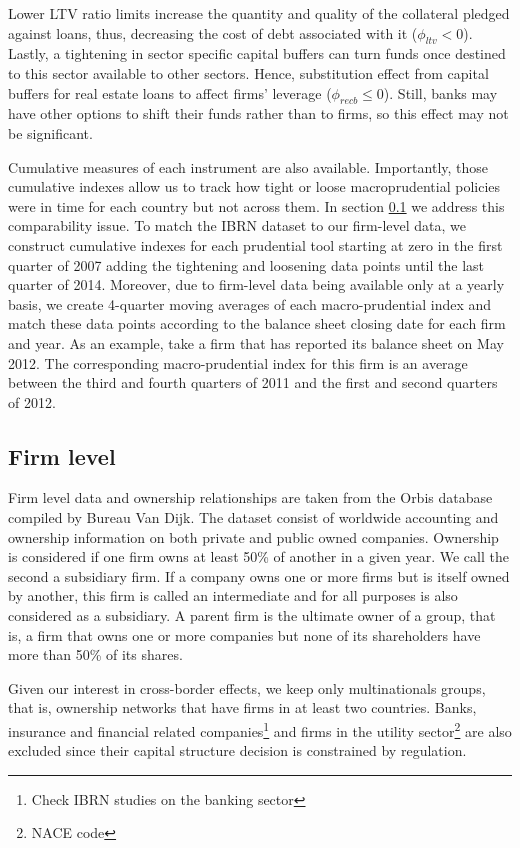 \documentclass[12pt]{article}
\begin{document}
Lower LTV ratio limits increase the quantity and quality of the collateral pledged against loans, thus, decreasing the cost of debt associated with it ($\phi_{ltv}<0$). Lastly, a tightening in sector specific capital buffers can turn funds once destined to this sector available to other sectors. Hence, substitution effect from capital buffers for real estate loans to affect firms' leverage ($\phi_{recb}\leq 0$). Still, banks may have other options to shift their funds rather than to firms, so this effect may not be significant.	 
	
    Cumulative measures of each instrument are also available. Importantly, those cumulative indexes allow us to track how tight or loose macroprudential policies were in time for each country but not across them. In section \ref{subsec:firm} we address this comparability issue. To match the IBRN dataset to our firm-level data, we construct cumulative indexes for each prudential tool starting at zero in the first quarter of 2007 adding the tightening and loosening data points until the last quarter of 2014. Moreover, due to firm-level data being available only at a yearly basis, we create 4-quarter moving averages of each macro-prudential index and match these data points according to the balance sheet closing date for each firm and year. As an example, take a firm that has reported its balance sheet on May 2012. The corresponding macro-prudential index for this firm is an average between the third and fourth quarters of 2011 and the first and second quarters of 2012. 
	  
 	\subsection{Firm level} \label{subsec:firm}
	Firm level data and ownership relationships are taken from the Orbis database compiled by Bureau Van Dijk.	The dataset consist of worldwide accounting and ownership information on both private and public owned companies. Ownership is considered if one firm owns at least 50\% of another in a given year. We call the second a subsidiary firm. If a company owns one or more firms but is itself owned by another, this firm is called an intermediate and for all purposes is also considered as a subsidiary. A parent firm is the ultimate owner of a group, that is, a firm that owns one or more companies but none of its shareholders have more than 50\% of its shares.
	
	Given our interest in cross-border effects, we keep only multinationals groups, that is, ownership networks that have firms in at least two countries. Banks, insurance and financial related companies\footnote{Check IBRN studies on the banking sector} and firms in the utility sector\footnote{NACE code} are also excluded since their capital structure decision is constrained by regulation.
	
\end{document}
